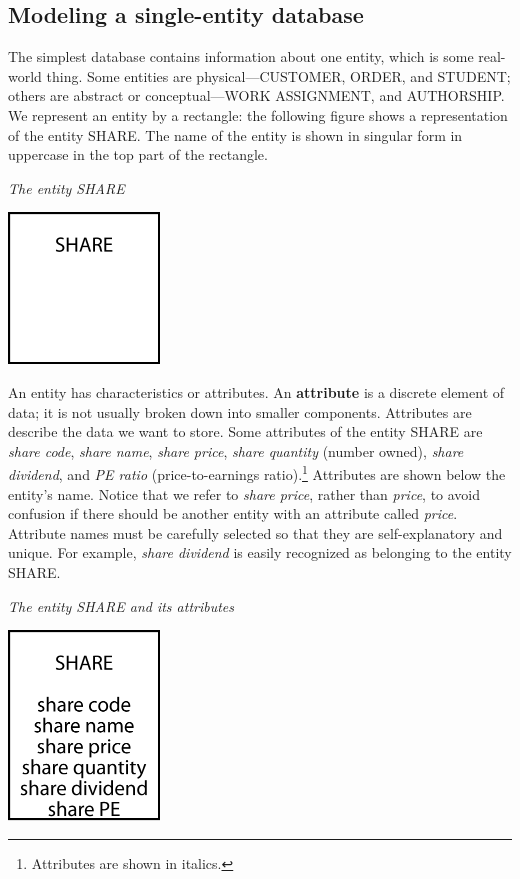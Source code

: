 \documentclass[
]{article}
\begin{document}
\hypertarget{modeling-a-single-entity-database}{%
\subsection{Modeling a single-entity
database}\label{modeling-a-single-entity-database}}

The simplest database contains information about one entity, which is
some real-world thing. Some entities are physical---CUSTOMER, ORDER, and
STUDENT; others are abstract or conceptual---WORK ASSIGNMENT, and
AUTHORSHIP. We represent an entity by a rectangle: the following figure
shows a representation of the entity SHARE. The name of the entity is
shown in singular form in uppercase in the top part of the rectangle.

\emph{The entity SHARE}

\includegraphics[width=1.58333in,height=\textheight]{Figures/Chapter 3/share.png}

An entity has characteristics or attributes. An \textbf{attribute} is a
discrete element of data; it is not usually broken down into smaller
components. Attributes are describe the data we want to store. Some
attributes of the entity SHARE are \emph{share code}, \emph{share name},
\emph{share price}, \emph{share quantity} (number owned), \emph{share
dividend}, and \emph{PE ratio} (price-to-earnings ratio).\footnote{Attributes
  are shown in italics.} Attributes are shown below the entity's name.
Notice that we refer to \emph{share price}, rather than \emph{price}, to
avoid confusion if there should be another entity with an attribute
called \emph{price}. Attribute names must be carefully selected so that
they are self-explanatory and unique. For example, \emph{share dividend}
is easily recognized as belonging to the entity SHARE.

\emph{The entity SHARE and its attributes}

\includegraphics[width=1.58333in,height=\textheight]{Figures/Chapter 3/share with attributes.png}
\end{document}
